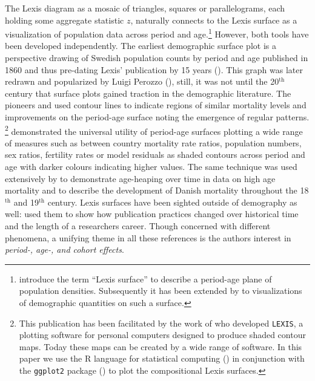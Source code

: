 \documentclass[parskip=half]{scrartcl}
\begin{document}
The Lexis diagram as a mosaic of triangles, squares or parallelograms, each holding some aggregate statistic $z$, naturally connects to the Lexis surface as a visualization of population data across period and age.\footnote{
  \textcite{Arthur1984} introduce the term \enquote{Lexis surface} to describe a period-age plane of population densities. Subsequently it has been extended by \textcite{Vaupel1987a} to visualizations of demographic quantities on such a surface.
}
However, both tools have been developed independently. The earliest demographic surface plot is a perspective drawing of Swedish population counts by period and age published in 1860 and thus pre-dating Lexis' publication by 15 years (\cite{Caselli1990}). This graph was later redrawn and popularized by Luigi Perozzo (\cite{Perozzo1880}), still, it was not until the 20$^\text{th}$ century that surface plots gained traction in the demographic literature. The pioneers \textcite{Kermack2001} and \textcite{Delaporte1942} used contour lines to indicate regions of similar mortality levels and improvements on the period-age surface noting the emergence of regular patterns. \textcite{Vaupel1987a}\footnote{
  This publication has been facilitated by the work of \textcite{Gambill1985} who developed \texttt{LEXIS}, a plotting software for personal computers designed to produce shaded contour maps. Today these maps can be created by a wide range of software. In this paper we use the R language for statistical computing (\cite{R2016}) in conjunction with the \texttt{ggplot2} package (\cite{Wickham2016}) to plot the compositional Lexis surfaces.
} demonstrated the universal utility of period-age surfaces plotting a wide range of measures such as between country mortality rate ratios, population numbers, sex ratios, fertility rates or model residuals as shaded contours across period and age with darker colours indicating higher values. The same technique was used extensively by \textcite{Andreev1999} to demonstrate age-heaping over time in data on high age mortality and to describe the development of Danish mortality throughout the 18$^\text{th}$ and 19$^\text{th}$ century. Lexis surfaces have been sighted outside of demography as well: \textcite{Sula2012} used them to show how publication practices changed over historical time and the length of a researchers career. Though concerned with different phenomena, a unifying theme in all these references is the authors interest in \emph{period-, age-, and cohort effects}.
\end{document}
